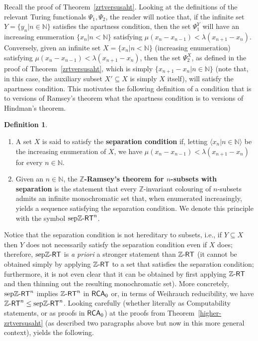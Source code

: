 \documentclass[11pt]{amsart}
\newcommand{\zrt}{\mathnormal{\mathbb Z\text{-}\mathsf{RT}}}
\newcommand{\sepzrt}{\mathnormal{\mathrm{sep}\mathbb Z\text{-}\mathsf{RT}}}
\newcommand{\rca}{\mathnormal{\mathsf{RCA}}_0}
\theoremstyle{definition}
\newtheorem{definition}[theorem]{Definition}
\begin{document}
Recall the proof of Theorem~\ref{zrtversusaht}. Looking at the definitions of the relevant Turing functionals $\Psi_1,\Psi_2$, the reader will notice that, if the infinite set $Y=\{y_n\big|n\in\mathbb N\}$ satisfies the apartness condition, then the set $\Psi_1^Y$ will have an increasing enumeration $\{x_n\big|n<\mathbb N\}$ satisfying $\mu(x_n-x_{n-1})<\lambda(x_{n+1}-x_n)$. Conversely, given an infinite set $X=\{x_n\big|n<\mathbb N\}$ (increasing enumeration) satisfying $\mu(x_n-x_{n-1})<\lambda(x_{n+1}-x_n)$, then the set $\Psi_2^X$, as defined in the proof of Theorem~\ref{zrtversusaht}, which is simply $\{x_{n+1}-x_n\big|n\in\mathbb N\}$ (note that, in this case, the auxiliary subset $X'\subseteq X$ is simply $X$ itself), will satisfy the apartness condition. This motivates the following definition of a condition that is to versions of Ramsey's theorem what the apartness condition is to versions of Hindman's theorem.

\begin{definition}\hfill
\begin{enumerate}
\item A set $X$ is said to satisfy the {\bf separation condition} if, letting $\langle x_n\big|n\in\mathbb N\rangle$ be the increasing enumeration of $X$, we have $\mu(x_n-x_{n-1})<\lambda(x_{n+1}-x_n)$ for every $n\in\mathbb N$.  
\item Given an $n\in\mathbb N$, the {\bf $\mathbb Z$-Ramsey's theorem for $n$-subsets with separation} is the statement that every $\mathbb Z$-invariant colouring of $n$-subsets admits an infinite monochromatic set that, when enumerated increasingly, yields a sequence satisfying the separation condition. We denote this principle with the symbol $\sepzrt^n$.
\end{enumerate}
\end{definition}

Notice that the separation condition is not hereditary to subsets, i.e., if $Y\subseteq X$ then $Y$ does not necessarily satisfy the separation condition even if $X$ does; therefore, $\sepzrt$ is {\it a priori} a stronger statement than $\zrt$ (it cannot be obtained simply by applying $\zrt$ to a set that satisfies the separation condition; furthermore, it is not even clear that it can be obtained by first applying $\zrt$ and then thinning out the resulting monochromatic set). More concretely, $\sepzrt^n$ implies $\zrt^n$ in $\rca$ or, in terms of Weihrauch reducibility, we have $\zrt^n\leq\sepzrt^n$. Looking carefully (whether literally as Computability statements, or as proofs in $\rca$) at the proofs from Theorem~\ref{higher-zrtversusaht} (as described two paragraphs above but now in this more general context), yields the following.
\end{document}
